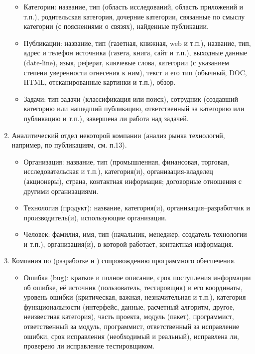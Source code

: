 \documentclass[12pt, openany, twoside]{book} %
\begin{document}
\begin{enumerate}
\begin{itemize}
\item Категории: название, тип (область исследований, область приложений и т.п.), родительская категория, дочерние категории, связанные по смыслу категории (с пояснениями о связях), найденные публикации.
\item Публикации: название, тип (газетная, книжная, web и т.п.), название, тип, адрес и телефон источника (газета, книга, сайт и т.п.), выходные данные (date-line), язык, реферат, ключевые слова, категории (с указанием степени уверенности отнесения к ним), текст и его тип (обычный, DOC, HTML, отсканированные картинки и т.п.), обзор.
\item Задачи: тип задачи (классификация или поиск), сотрудник (создавший категорию или нашедший публикацию, ответственный за категорию или публикацию и т.п.), завершена ли работа над задачей.
\end{itemize}
\item Аналитический отдел некоторой компании (анализ рынка технологий, например, по публикациям, см. п.13).
\begin{itemize}
\item Организация: название, тип (промышленная, финансовая, торговая, исследовательская и т.п.), категория(и), организация-владелец (акционеры), страна, контактная информация; договорные отношения с другими организациями.
\item Технология (продукт): название, категория(и), организация--разработчик и производитель(и), использующие организации.
\item Человек: фамилия, имя, тип (начальник, менеджер, создатель технологии и т.п.), организация(и), в которой работает, контактная информация.
\end{itemize}
\item Компания по (разработке и ) сопровождению программного обеспечения.
\begin{itemize}
\item Ошибка (bug): краткое и полное описание, срок поступления информации об ошибке, её источник (пользователь, тестировщик) и его координаты, уровень ошибки (критическая, важная, незначительная и т.п.), категория функциональности (интерфейс, данные, расчетный алгоритм, другое, неизвестная категория), часть проекта, модуль (пакет), программист, ответственный за модуль, программист, ответственный за исправление ошибки, срок исправления (необходимый и реальный), исправлена ли, проверено ли исправление тестировщиком.
\end{itemize}
\end{enumerate}
\end{document}
